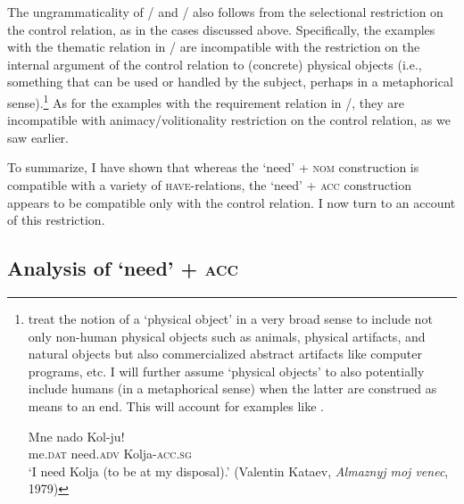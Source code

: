 \documentclass[output=paper,colorlinks,citecolor=brown]{langscibook}
\begin{document}
\ea
{}
\z\z

\noindent The ungrammaticality of / and  / also follows from the selectional restriction on the control relation, as in the cases discussed above. Specifically, the examples with the thematic relation in / are incompatible with the restriction on the internal argument of the control relation to (concrete) physical objects (i.e., something that can be used or handled by the subject, perhaps in a metaphorical sense).\footnote{\citet{Vikner.Jensen2002} treat the notion of a `physical object' in a very broad sense to include not only non-human physical objects such as animals, physical artifacts, and natural objects but also commercialized abstract artifacts like computer programs, etc. I will further assume `physical objects' to also potentially include humans (in a metaphorical sense) when the latter are construed as means to an end. This will account for examples like .

\ea \label{nuzhno-control-anim}
\gll Mne nado Kol-ju!\\
me.\textsc{dat} need.\textsc{adv} Kolja-\textsc{acc.sg}\\
\glt `I need Kolja (to be at my disposal).’ \hfill (Valentin Kataev, \textit{Almaznyj moj venec}, 1979)
\z
} As for the examples with the requirement relation in /, they are incompatible with animacy/volitionality restriction on the control relation, as we saw earlier.

To summarize, I have shown that whereas the `need' + \textsc{nom} construction is compatible with a variety of \textsc{have}-relations, the `need' + \textsc{acc} construction appears to be compatible only with the control relation. I now turn to an account of this restriction.

\subsection{Analysis of `need' + \textsc{acc}}\label{section-acc-analysis}
\end{document}

